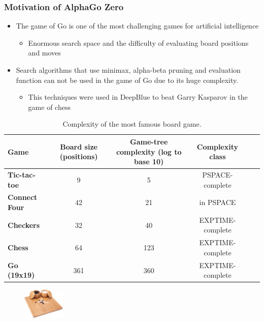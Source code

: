 \documentclass[9pt]{beamer}
\begin{document}
\begin{frame}
	\frametitle{Motivation of AlphaGo Zero}
	\begin{itemize}
		\item The game of Go is one of the most challenging games for artificial intelligence
		\begin{itemize}
			\item Enormous search space and the difficulty of evaluating board positions and moves
		\end{itemize}
		\item Search algorithms that use minimax, alpha-beta pruning and evaluation function can not be used in the game of Go due to its huge complexity.
		\begin{itemize}
			\item This techniques were used in DeepBlue\cite{CAMPBELL200257} to beat Garry Kasparov in the game of chess
		\end{itemize}
		
	\end{itemize}
	
	\begin{table}

		\tiny
		\centering
		
		\begin{tabular}{lccccc}

		\hline
		\textbf{Game}  &
		Board size (positions)  &
		Game-tree complexity (log to base 10)  &
		Complexity class\\
		\hline
		\hline
		\textbf{Tic-tac-toe}	& 9  & 5 & PSPACE-complete\cite{Reisch1981HexIP} \\
		\textbf{Connect Four} & 42 & 21 & in PSPACE \cite{Allis1994SearchingFS} \\
		\textbf{Checkers} & 32  & 40   & EXPTIME-complete \cite{Robson1984NBN} \\
		\textbf{Chess} & 64 & 123  & EXPTIME-complete \cite{FRAENKEL1981199} \\
		\textbf{Go (19x19)} & 361 & 360 & EXPTIME-complete \cite{inproceedings} \\
		\hline
		\end{tabular}
		\caption{Complexity of the most famous board game.}
		\label{tab:game-complexity}
		
	\end{table}

	
	\begin{figure}[h]
		\centering
		\includegraphics[width=2cm]{go-board.jpg}
	\end{figure}

\end{frame}
\end{document}

